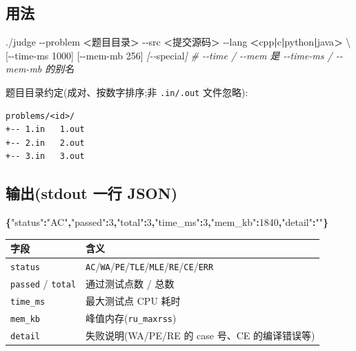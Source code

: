 \documentclass[
  11pt,
]{ctexart}
\newenvironment{Shaded}{\begin{snugshade}}{\end{snugshade}}
\newcommand{\AttributeTok}[1]{\textcolor[rgb]{0.13,0.29,0.53}{#1}}
\newcommand{\CommentTok}[1]{\textcolor[rgb]{0.56,0.35,0.01}{\textit{#1}}}
\newcommand{\DataTypeTok}[1]{\textcolor[rgb]{0.13,0.29,0.53}{#1}}
\newcommand{\DecValTok}[1]{\textcolor[rgb]{0.00,0.00,0.81}{#1}}
\newcommand{\ExtensionTok}[1]{#1}
\newcommand{\FunctionTok}[1]{\textcolor[rgb]{0.13,0.29,0.53}{\textbf{#1}}}
\newcommand{\KeywordTok}[1]{\textcolor[rgb]{0.13,0.29,0.53}{\textbf{#1}}}
\newcommand{\NormalTok}[1]{#1}
\newcommand{\OperatorTok}[1]{\textcolor[rgb]{0.81,0.36,0.00}{\textbf{#1}}}
\newcommand{\PreprocessorTok}[1]{\textcolor[rgb]{0.56,0.35,0.01}{\textit{#1}}}
\newcommand{\SpecialStringTok}[1]{\textcolor[rgb]{0.31,0.60,0.02}{#1}}
\newcommand{\StringTok}[1]{\textcolor[rgb]{0.31,0.60,0.02}{#1}}
\begin{document}
\hypertarget{ux7528ux6cd5}{%
\subsection{用法}\label{ux7528ux6cd5}}

\begin{Shaded}
\begin{Highlighting}[]
\ExtensionTok{./judge} \AttributeTok{{-}{-}problem} \OperatorTok{\textless{}}\NormalTok{题目目录}\OperatorTok{\textgreater{}}\NormalTok{ {-}{-}src }\OperatorTok{\textless{}}\NormalTok{提交源码}\OperatorTok{\textgreater{}}\NormalTok{ {-}{-}lang }\OperatorTok{\textless{}}\NormalTok{cpp}\KeywordTok{|}\ExtensionTok{c}\KeywordTok{|}\ExtensionTok{python}\KeywordTok{|}\ExtensionTok{java}\OperatorTok{\textgreater{}} \DataTypeTok{\textbackslash{}}
\NormalTok{        [{-}{-}time{-}ms 1000] [{-}{-}mem{-}mb 256] }\PreprocessorTok{[{-}{-}}\SpecialStringTok{special}\PreprocessorTok{]}
\CommentTok{\# {-}{-}time / {-}{-}mem 是 {-}{-}time{-}ms / {-}{-}mem{-}mb 的别名}
\end{Highlighting}
\end{Shaded}

题目目录约定(成对、按数字排序;非 \texttt{.in/.out} 文件忽略):

\begin{verbatim}
problems/<id>/
+-- 1.in   1.out
+-- 2.in   2.out
+-- 3.in   3.out
\end{verbatim}

\hypertarget{ux8f93ux51fastdout-ux4e00ux884c-json}{%
\subsection{输出(stdout 一行
JSON)}\label{ux8f93ux51fastdout-ux4e00ux884c-json}}

\begin{Shaded}
\begin{Highlighting}[]
\FunctionTok{\{}\DataTypeTok{"status"}\FunctionTok{:}\StringTok{"AC"}\FunctionTok{,}\DataTypeTok{"passed"}\FunctionTok{:}\DecValTok{3}\FunctionTok{,}\DataTypeTok{"total"}\FunctionTok{:}\DecValTok{3}\FunctionTok{,}\DataTypeTok{"time\_ms"}\FunctionTok{:}\DecValTok{3}\FunctionTok{,}\DataTypeTok{"mem\_kb"}\FunctionTok{:}\DecValTok{1840}\FunctionTok{,}\DataTypeTok{"detail"}\FunctionTok{:}\StringTok{""}\FunctionTok{\}}
\end{Highlighting}
\end{Shaded}

\begin{longtable}[]{@{}ll@{}}
\toprule\noalign{}
字段 & 含义 \\
\midrule\noalign{}
\endhead
\bottomrule\noalign{}
\endlastfoot
\texttt{status} &
\texttt{AC}/\texttt{WA}/\texttt{PE}/\texttt{TLE}/\texttt{MLE}/\texttt{RE}/\texttt{CE}/\texttt{ERR} \\
\texttt{passed} / \texttt{total} & 通过测试点数 / 总数 \\
\texttt{time\_ms} & 最大测试点 CPU 耗时 \\
\texttt{mem\_kb} & 峰值内存(\texttt{ru\_maxrss}) \\
\texttt{detail} & 失败说明(WA/PE/RE 的 case 号、CE 的编译错误等) \\
\end{longtable}
\end{document}
